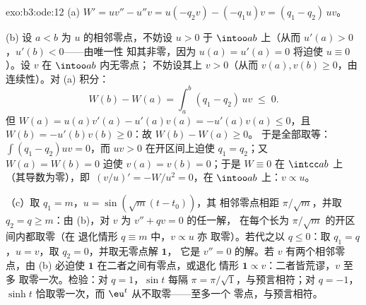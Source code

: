 \begin{solution}{exo:b3:ode:12}
(a) $W' = uv'' - u''v = u(-q_2v) - (-q_1u)v = (q_1 -
q_2)\,uv$。

(b) 设 $a < b$ 为 $u$ 的相邻零点，不妨设 $u >
0$ 于 $\intoo ab$ 上（从而 $u'(a) > 0$，$u'(b) < 0$——由唯一性
知其非零，因为 $u(a) = u'(a) = 0$ 将迫使 $u
\equiv 0$）。设 $v$ 在 $\intoo ab$ 内无零点；
不妨设其上 $v > 0$（从而 $v(a), v(b) \geq 0$，由
连续性）。对 (a) 积分：
\[
W(b) - W(a) = \int_a^b(q_1 - q_2)\,uv \;\leq\; 0 .
\]
但 $W(a) = u(a)v'(a) - u'(a)v(a) = -u'(a)v(a) \leq 0$，且
$W(b) = -u'(b)v(b) \geq 0$：故 $W(b) - W(a) \geq 0$。
于是全部取等：$\int(q_1 - q_2)uv = 0$，而 $uv > 0$
在开区间上迫使 $q_1 = q_2$；又 $W(a) =
W(b) = 0$ 迫使 $v(a) = v(b) = 0$；于是 $W \equiv 0$ 在
$\intcc ab$ 上（其导数为零），即\
$(v/u)' = -W/u^2 = 0$，在 $\intoo ab$ 上：$v \propto u$。

（c）取 $q_1 = m$，$u = \sin(\sqrt m(t - t_0))$，其
相邻零点相距 $\pi/\sqrt m$，并取 $q_2 = q \geq
m$：由 (b)，对 $v$ 为 $v'' + qv = 0$ 的任一解，
在每个长为 $\pi/\sqrt m$ 的开区间内都取零（在
退化情形 $q \equiv m$ 中，$v \propto u$ 亦
取零）。若代之以 $q \leq 0$：取 $q_1 = q$，$u =
v$，取 $q_2 = 0$，并取无零点解 $\mathbf 1$，
它是 $v'' = 0$ 的解。若 $v$ 有两个相邻零点，由 (b)
必迫使 $\mathbf 1$ 在二者之间有零点，或退化
情形 $\mathbf 1 \propto v$：二者皆荒谬，$v$ 至多
取零一次。检验：对 $q = 1$，$\sin t$ 每隔 $\pi
= \pi/\sqrt1$，与预言相符；对 $q = -1$，$\sinh t$
恰取零一次，而 $\eu^t$ 从不取零——至多一个
零点，与预言相符。
\end{solution}

